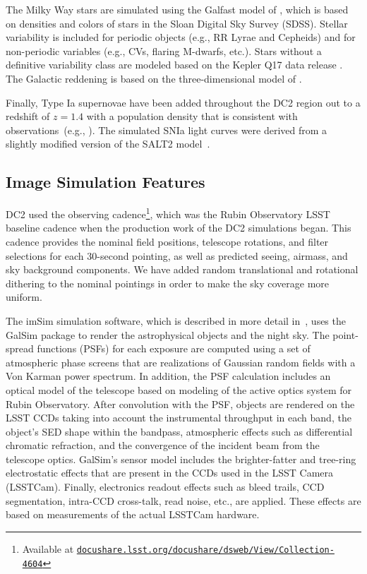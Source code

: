 \documentclass[modern]{descnote}
\newcommand*{\https}[1]{\href{https://#1}{\nolinkurl{#1}}}
\begin{document}
The Milky Way stars are simulated using the Galfast model of \citet{2008ApJ...673..864J}, which is based on densities and colors of stars in the Sloan Digital Sky Survey (SDSS). Stellar variability is included for periodic objects (e.g., RR Lyrae and Cepheids) and for non-periodic variables (e.g., CVs, flaring M-dwarfs, etc.).  Stars without a definitive variability class are modeled based on the Kepler Q17 data release \citep{2016ksci.rept....3T}.  The Galactic reddening is based on the three-dimensional model of \cite{2005AJ....130..659A}.

Finally, Type Ia supernovae have been added throughout the DC2 region out to a redshift of $z=1.4$ with a population density that is consistent with observations~(e.g., \citealt{2010ApJ...713.1026D}). The simulated SNIa light curves were derived from a slightly modified version of the SALT2 model~\citep{2007A&A...466...11G}.

\subsection{Image Simulation Features}

DC2 used the  observing cadence\footnote{Available at \https{docushare.lsst.org/docushare/dsweb/View/Collection-4604}}, which was the Rubin Observatory LSST baseline cadence when the production work of the DC2 simulations began. This cadence provides the nominal field positions, telescope rotations, and filter selections for each 30-second pointing, as well as predicted seeing, airmass, and sky background components.  We have added random translational and rotational dithering to the nominal pointings in order to make the sky coverage more uniform.

The imSim simulation software, which is described in more detail in~\cite{2020arXiv201005926L}, uses the GalSim package \citep{2015A&C....10..121R} to render the astrophysical objects and the night sky.  The point-spread functions (PSFs) for each exposure are computed using a set of atmospheric phase screens that are realizations of Gaussian random fields with a Von Karman power spectrum.  In addition, the PSF calculation includes an optical model of the telescope based on modeling of the active optics system for Rubin Observatory.  After convolution with the PSF, objects are rendered on the LSST CCDs taking into account the instrumental throughput in each band, the object's SED shape within the bandpass, atmospheric effects such as differential chromatic refraction, and the convergence of the incident beam from the telescope optics. GalSim's sensor model includes the brighter-fatter and tree-ring electrostatic effects that are present in the CCDs used in the LSST Camera (LSSTCam).  Finally, electronics readout effects such as bleed trails, CCD segmentation, intra-CCD cross-talk, read noise, etc., are applied.  These effects are based on measurements of the actual LSSTCam hardware.
\end{document}
